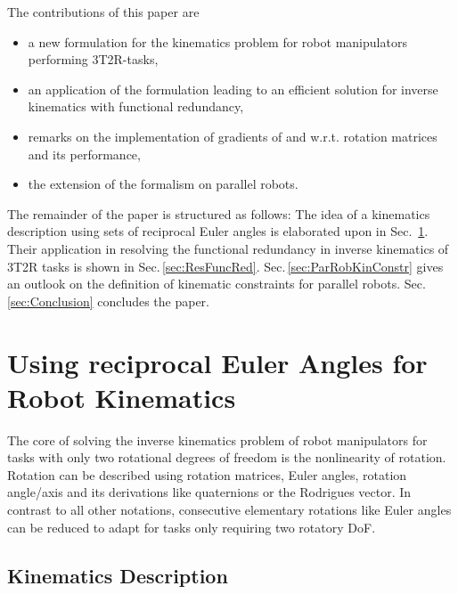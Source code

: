 \documentclass[twocolumn,10pt]{IFTOMM}
\begin{document}
The contributions of this paper are
\begin{itemize}
    \item a new formulation for the kinematics problem for robot manipulators performing 3T2R-tasks,
    \item an application of the formulation leading to an efficient solution for inverse kinematics with functional redundancy,
    \item remarks on the implementation of gradients of and w.r.t. rotation matrices and its performance,
    \item the extension of the formalism on parallel robots.
\end{itemize}

The remainder of the paper is structured as follows: The idea of a kinematics description using sets of reciprocal Euler angles is elaborated upon in Sec.\, \ref{sec:RecEulAng}.
Their application in resolving the functional redundancy in inverse kinematics of 3T2R tasks is shown in Sec.\,\ref{sec:ResFuncRed}.
Sec.\,\ref{sec:ParRobKinConstr} gives an outlook on the definition of kinematic constraints for parallel robots. 
Sec.\,\ref{sec:Conclusion} concludes the paper.

\section{Using reciprocal Euler Angles for Robot Kinematics}
\label{sec:RecEulAng}

The core of solving the inverse kinematics problem of robot manipulators for tasks with only two rotational degrees of freedom is the nonlinearity of rotation.
Rotation can be described using rotation matrices, Euler angles, rotation angle/axis and its derivations like quaternions or the Rodrigues vector.
In contrast to all other notations, consecutive elementary rotations like Euler angles can be reduced to adapt for tasks only requiring two rotatory DoF.

\subsection{Kinematics Description}
\label{sec:RecEulAng_KinDesc}
\end{document}

